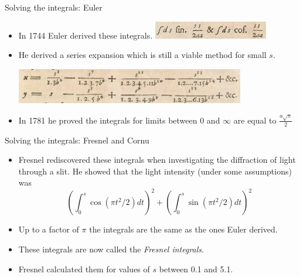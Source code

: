 \documentclass{beamer}
\begin{document}
\begin{frame}{Solving the integrals: Euler}
	\begin{itemize}
		\item In 1744 Euler derived these integrals.
		\includegraphics[width=50mm, scale=0.5]{euler_scripture_1.png}	
		\item He derived a series expansion which is still a viable method for small $s$.
		
		\includegraphics[width=100mm, scale=0.7]{euler_scripture.png}
		
		\item In 1781 he proved the integrals for limits between 0 and $\infty$ are equal to  $\frac{a \sqrt{\pi}}{2}$ 
	\end{itemize}
\end{frame}

\begin{frame}{Solving the integrals: Fresnel and Cornu}
	\begin{itemize}
		\item Fresnel rediscovered these integrals when investigating the diffraction of light through a slit. He showed that the light intensity (under some assumptions) was 
		\[
		\left( \int_{0}^{s}\cos \left( \pi t^2 / 2 \right) dt \right) ^2 + 
		\left( \int_{0}^{s}\sin \left( \pi t^2 / 2 \right) dt \right) ^2
		\] 
		\item Up to a factor of $\pi$ the integrals are the same as the ones Euler derived.
		\item These integrals are now called the \emph{Fresnel integrals}.
		\item Fresnel calculated them for values of $s$ between 0.1 and 5.1.
	\end{itemize}
\end{frame}
\end{document}
